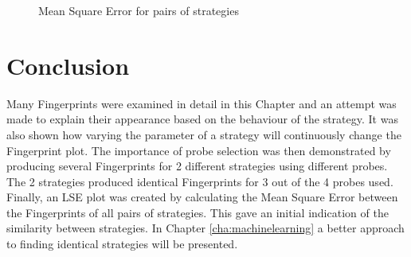 \begin{figure}[htbp!]
    \caption{Mean Square Error for pairs of strategies}
    \label{fig:mean_squares}
\end{figure}



\section{Conclusion}

Many Fingerprints were examined in detail in this Chapter and an attempt was made to explain their appearance based on the behaviour of the strategy.
It was also shown how varying the parameter of a strategy will continuously change the Fingerprint plot.
The importance of probe selection was then demonstrated by producing several Fingerprints for 2 different strategies using different probes.
The 2 strategies produced identical Fingerprints for 3 out of the 4 probes used.
Finally, an LSE plot was created by calculating the Mean Square Error between the Fingerprints of all pairs of strategies.
This gave an initial indication of the similarity between strategies.
In Chapter \ref{cha:machinelearning} a better approach to finding identical strategies will be presented.

